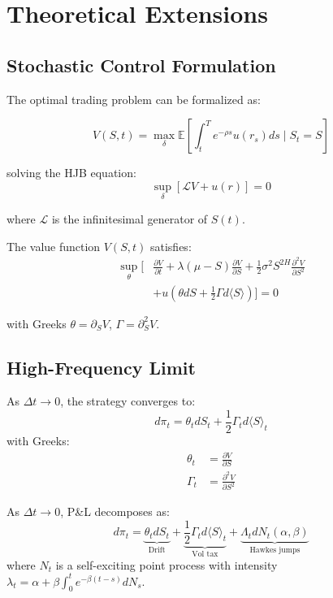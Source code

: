 \documentclass[article]{arithmaxresearch}
\begin{document}
\section{Theoretical Extensions}

\subsection{Stochastic Control Formulation}

The optimal trading problem can be formalized as:

\begin{equation}
V(S,t) = \max_{\delta} \mathbb{E}\left[ \int_t^T e^{-\rho s} u(r_s) ds \;\bigg|\; S_t = S \right]
\end{equation}

solving the HJB equation:
\begin{equation}
\sup_{\delta} \left[ \mathcal{L}V + u(r) \right] = 0
\end{equation}

where $\mathcal{L}$ is the infinitesimal generator of $S(t)$.

The value function $V(S,t)$ satisfies:
\begin{align}
\sup_{\theta} \bigg[ & \frac{\partial V}{\partial t} + \lambda(\mu - S)\frac{\partial V}{\partial S} + \frac{1}{2}\sigma^2 S^{2H}\frac{\partial^2 V}{\partial S^2} \\
& + u\left(\theta dS + \frac{1}{2}\Gamma d\langle S\rangle\right) \bigg] = 0 \nonumber
\end{align}

with Greeks $\theta = \partial_S V$, $\Gamma = \partial^2_S V$.

\subsection{High-Frequency Limit}

As $\Delta t \to 0$, the strategy converges to:
\begin{equation}
d\pi_t = \theta_t dS_t + \frac{1}{2} \Gamma_t d\langle S \rangle_t
\end{equation}
with Greeks:
\begin{align}
\theta_t &= \frac{\partial V}{\partial S} \\
\Gamma_t &= \frac{\partial^2 V}{\partial S^2}
\end{align}

As $\Delta t \to 0$, P\&L decomposes as:
\begin{equation}
d\pi_t = \underbrace{\theta_t dS_t}_{\text{Drift}} + \underbrace{\frac{1}{2}\Gamma_t d\langle S\rangle_t}_{\text{Vol tax}} + \underbrace{\Lambda_t dN_t(\alpha,\beta)}_{\text{Hawkes jumps}}
\end{equation}
where $N_t$ is a self-exciting point process with intensity $\lambda_t = \alpha + \beta \int_0^t e^{-\beta(t-s)}dN_s$.
\end{document}
